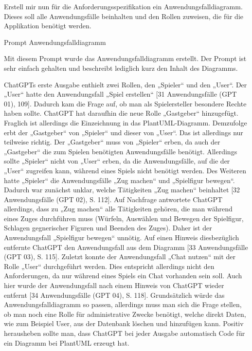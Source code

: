 \begin{prompt}[H]
    \begin{tcolorbox}[colback=gray!20, colframe=gray!20, boxrule=0pt, sharp corners] 
        Erstell mir nun für die Anforderungsspezifikation ein Anwendungsfalldiagramm. Dieses soll alle Anwendungsfälle beinhalten und den Rollen zuweisen, die für die 
        Applikation benötigt werden.
        \vfill
    \end{tcolorbox}
    \caption{Prompt Anwendungsfalldiagramm}
    \label{Prompt Anwendungsfalldiagramm}
\end{prompt}

Mit diesem Prompt wurde das Anwendungsfalldiagramm erstellt. Der Prompt ist sehr einfach gehalten und beschreibt lediglich kurz den Inhalt des Diagramms.

ChatGPTs erste Ausgabe enthielt zwei Rollen, den „Spieler“ und den „User“. Der „User“ hatte den Anwendungsfall „Spiel erstellen“ 
[31 Anwendungsfälle (GPT 01), 109]. Dadurch kam die Frage auf, ob man als Spielersteller besondere Rechte haben sollte. ChatGPT hat 
daraufhin die neue Rolle „Gastgeber“ hinzugefügt. Fraglich ist allerdings die Einzeichnung in das PlantUML-Diagramm. Demzufolge erbt der 
„Gastgeber“ von „Spieler“ und dieser von „User“. Das ist allerdings nur teilweise richtig. Der „Gastgeber“ muss von „Spieler“ erben, 
da auch der „Gastgeber“ die zum Spielen benötigten Anwendungsfälle benötigt. Allerdings sollte „Spieler“ nicht von „User“ erben, da 
die Anwendungsfälle, auf die der „User“ zugreifen kann, während eines Spiels nicht benötigt werden. Des Weiteren hatte „Spieler“ die 
Anwendungsfälle „Zug machen“ und „Spielfigur bewegen“. Dadurch war zunächst unklar, welche Tätigkeiten „Zug machen“ beinhaltet 
[32 Anwendungsfälle (GPT 02), S. 112]. Auf Nachfrage antwortete ChatGPT allerdings, dass zu „Zug machen“ alle Tätigkeiten gehören, die man 
während eines Zuges durchführen muss (Würfeln, Auswählen und Bewegen der Spielfigur, Schlagen gegnerischer Figuren und Beenden des Zuges). 
Daher ist der Anwendungsfall „Spielfigur bewegen“ unnötig. Auf einen Hinweis diesbezüglich entfernte ChatGPT den Anwendungsfall aus dem 
Diagramm [33 Anwendungsfälle (GPT 03), S. 115]. Zuletzt konnte der Anwendungsfall „Chat nutzen“ mit der Rolle „User“ durchgeführt 
werden. Dies entspricht allerdings nicht den Anforderungen, da nur während eines Spiels ein Chat vorhanden sein soll. Auch hier wurde 
der Anwendungsfall nach einem Hinweis von ChatGPT wieder entfernt [34 Anwendungsfälle (GPT 04), S. 118]. Grundsätzlich würde das 
Anwendungsfalldiagramm so passen, allerdings muss man sich die Frage stellen, ob man noch eine Rolle für administrative Zwecke benötigt, 
welche direkt Daten, wie zum Beispiel User, aus der Datenbank löschen und hinzufügen kann. Positiv herausheben sollte man, dass ChatGPT 
bei jeder Ausgabe automatisch Code für ein Diagramm bei PlantUML erzeugt hat.

